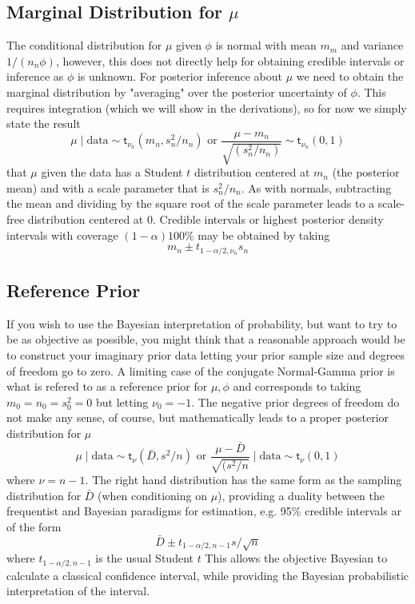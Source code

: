 \documentclass[11pt]{article}
\newcommand{\St}{\textsf{t}}
\def\data{\text{data}}
\begin{document}
\subsection*{Marginal Distribution for $\mu$}
The conditional distribution for $\mu$ given $\phi$ is normal with mean $m_m$ and
variance $1/(n_n \phi)$, however, this does not directly help for obtaining credible intervals or inference as $\phi$ is unknown.
For posterior inference about $\mu$ we need to obtain the marginal distribution by
"averaging"  over the posterior uncertainty of $\phi$.  This requires integration (which we will show in the derivations), so for now we simply state the  result 
$$
\mu \mid \data  \sim \St_{\nu_n}(m_n, s^2_n/n_n)  \text{ or }  \frac{\mu - m_n}{\sqrt{(s^2_n/n_n)}} \sim \St_{\nu_n}(0,1)
$$
that $\mu$ given the data has a Student $t$ distribution centered at  $m_n$ (the posterior mean) and with a scale parameter that is $s^2_n/n_n$.   As with normals, subtracting the mean and dividing by the square root of the scale parameter leads to a scale-free distribution centered at 0.  Credible intervals or highest posterior density intervals with coverage $(1 - \alpha) 100\%$ may be obtained by taking 
$$m_n \pm t_{1 - \alpha/2, \nu_n} s_n$$



\subsection*{Reference Prior}

If you wish to use the Bayesian interpretation of probability, but want to try to be as objective as possible, you might think that a reasonable approach would be to construct your imaginary prior data letting your prior sample size and degrees of freedom go to zero.  A limiting case of the conjugate Normal-Gamma prior is what is refered to as a reference prior for $\mu, \phi$ and corresponds to taking $m_0 = n_0 = s^2_0 = 0$ but letting $\nu_0 = -1$. 
The negative prior degrees of freedom do not make any sense, of course, but mathematically leads to 
a proper posterior distribution for $\mu$ 
$$
\mu \mid \data  \sim \St_{\nu}(\bar{D}, s^2/n)  \text{ or }  \frac{\mu - \bar{D}}{\sqrt{(s^2/n}}  \mid \data \sim \St_{\nu}(0,1)
$$
where $\nu = n - 1$.
The right hand distribution has the same form as the sampling distribution  for $\bar{D}$ (when conditioning on $\mu$), providing a duality between the frequentist and Bayesian paradigms for estimation, e.g.  95\% credible intervals ar of the form
$$\bar{D} \pm t_{1 - \alpha/2, n - 1} s/\sqrt{n}$$
where  $t_{1 - \alpha/2, n - 1}$  is the usual Student $t$
This allows the objective Bayesian to calculate a classical 
confidence interval, while providing the Bayesian probabilistic interpretation of the interval.
\end{document}
